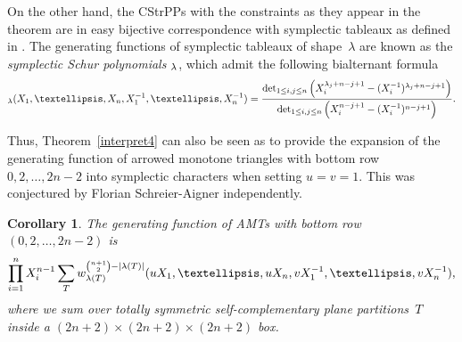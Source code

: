 \documentclass[12pt]{amsart}
\newtheorem{cor}[theorem]{Corollary}
\theoremstyle{definition}
\numberwithin{equation}{section}
\newcommand{\CSPPs}{CStrPPs\xspace}
\let\sp\relax
\DeclareMathOperator{\sp}{sp}
\begin{document}
On the other hand, the \CSPPs with the constraints as they appear in the theorem are in easy bijective correspondence with {symplectic tableaux} as defined in \cite[Section 4]{KoiTer90}. The generating functions of symplectic tableaux of shape~$\lambda$ are known as the \emph{symplectic Schur polynomials $\sp_\lambda$}, which admit the following bialternant formula
	\begin{equation*}
		\sp_{\lambda} (X_1,\dots,X_n,X_1^{-1},\dots,X_n^{-1}) = \frac{\det_{1 \le i,j \le n} \left(X_i^{\lambda_j + n - j + 1} - (X_i^{-1})^{\lambda_j + n - j + 1} \right)}{\det_{1 \le i,j \le n} \left(X_i^{n - j + 1} - (X_i^{-1})^{n - j + 1} \right)}.
	\end{equation*}


Thus, Theorem~\ref{interpret4} 
can also be seen as to provide the expansion of the generating function of arrowed monotone triangles with bottom row $0,2,\ldots,2n-2$ into symplectic characters when setting $u=v=1$. This was conjectured by Florian Schreier-Aigner \cite{FloPrivate} independently.


\begin{cor}\label{cor:expansion}
	The generating function of AMTs with bottom row $(0,2,\dots,2n-2)$ is
	\[
	\prod_{i=1}^{n} X_i^{n-1} \sum_{T} w^{\binom{n+1}{2}-|\lambda(T)|} \sp_{\lambda(T)}(u X_1,\ldots, u X_n, v X_1^{-1},\ldots,v X_n^{-1}),
	\]
	where we sum over totally symmetric self-complementary plane partitions~$T$  inside a $(2n+2) \times (2n+2) \times (2n+2)$ box.
\end{cor}
\end{document}
